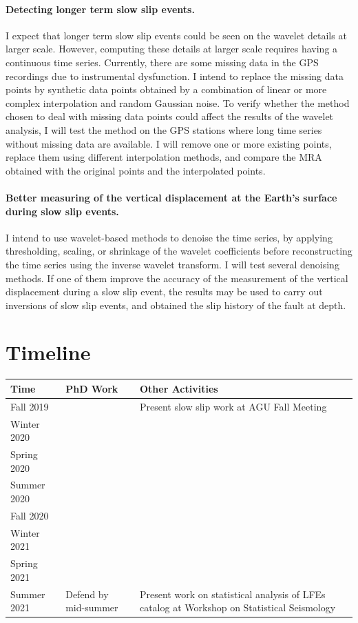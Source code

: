 \documentclass[letterpaper, 12pt]{article}
\begin{document}
\paragraph{Detecting longer term slow slip events.} I expect that longer term slow slip events could be seen on the wavelet details at larger scale. However, computing these details at larger scale requires having a continuous time series. Currently, there are some missing data in the GPS recordings due to instrumental dysfunction. I intend to replace the missing data points by synthetic data points obtained by a combination of linear or more complex interpolation and random Gaussian noise. To verify whether the method chosen to deal with missing data points could affect the results of the wavelet analysis, I will test the method on the GPS stations where long time series without missing data are available. I will remove one or more existing points, replace them using different interpolation methods, and compare the MRA obtained with the original points and the interpolated points.

\paragraph{Better measuring of the vertical displacement at the Earth's surface during slow slip events.}  I intend to use wavelet-based methods to denoise the time series, by applying thresholding, scaling, or shrinkage of the wavelet coefficients before reconstructing the time series using the inverse wavelet transform. I will test several denoising methods. If one of them improve the accuracy of the measurement of the vertical displacement during a slow slip event, the results may be used to carry out inversions of slow slip events, and obtained the slip history of the fault at depth.

\section{Timeline}

\begin{center}
\begin{tabular}{| p{3cm} p{6cm} p{6cm} |}
  \hline
  \textbf{Time} & \textbf{PhD Work} & \textbf{Other Activities} \\
  \hline
  Fall 2019 & & Present slow slip work at AGU Fall Meeting \\
  \hline
  Winter 2020 & & \\
  \hline
  Spring 2020 & & \\
  \hline
  Summer 2020 & & \\
  \hline
  Fall 2020 & & \\
  \hline
  Winter 2021 & & \\
  \hline
  Spring 2021 & & \\
  \hline
  Summer 2021 & Defend by mid-summer & Present work on statistical analysis of LFEs catalog at Workshop on Statistical Seismology \\
  \hline
\end{tabular}
\end{center}
\end{document}
